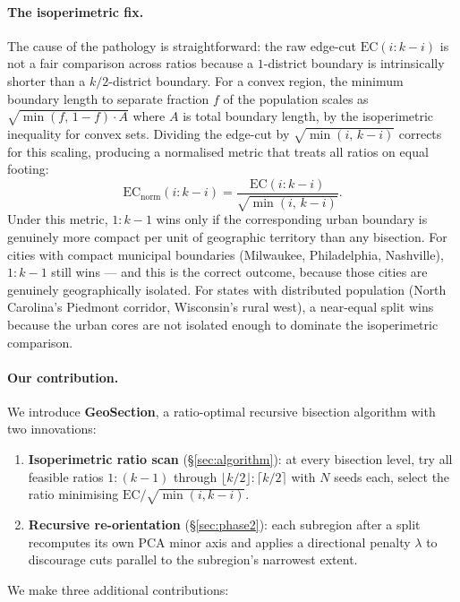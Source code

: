 \paragraph{The isoperimetric fix.}
The cause of the pathology is straightforward: the raw edge-cut $\mathrm{EC}(i:k-i)$
is not a fair comparison across ratios because a $1$-district boundary is
intrinsically shorter than a $k/2$-district boundary.
For a convex region, the minimum boundary length to separate fraction $f$
of the population scales as $\sqrt{\min(f,\,1-f) \cdot A}$ where $A$ is total
boundary length, by the isoperimetric inequality for convex sets.
Dividing the edge-cut by $\sqrt{\min(i,\,k-i)}$ corrects for this scaling,
producing a normalised metric that treats all ratios on equal footing:
\[
  \mathrm{EC}_{\text{norm}}(i:k-i) = \frac{\mathrm{EC}(i:k-i)}{\sqrt{\min(i,\,k-i)}}.
\]
Under this metric, $1:k-1$ wins only if the corresponding urban boundary is
genuinely more compact per unit of geographic territory than any bisection.
For cities with compact municipal boundaries (Milwaukee, Philadelphia, Nashville),
$1:k-1$ still wins --- and this is the correct outcome, because those cities
are genuinely geographically isolated.
For states with distributed population (North Carolina's Piedmont corridor,
Wisconsin's rural west), a near-equal split wins because the urban cores are
not isolated enough to dominate the isoperimetric comparison.

\paragraph{Our contribution.}
We introduce \textbf{GeoSection}, a ratio-optimal recursive bisection algorithm
with two innovations:

\begin{enumerate}
\item \textbf{Isoperimetric ratio scan} (\S\ref{sec:algorithm}):
  at every bisection level, try all feasible ratios $1:(k-1)$ through
  $\lfloor k/2\rfloor:\lceil k/2\rceil$ with $N$ seeds each, select the
  ratio minimising $\mathrm{EC}/\sqrt{\min(i,k-i)}$.

\item \textbf{Recursive re-orientation} (\S\ref{sec:phase2}):
  each subregion after a split recomputes its own PCA minor axis and
  applies a directional penalty $\lambda$ to discourage cuts parallel to
  the subregion's narrowest extent.
\end{enumerate}

We make three additional contributions:

